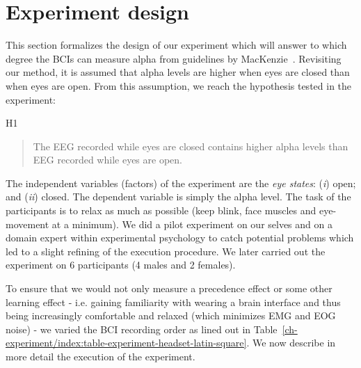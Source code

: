 \documentclass[a4paper,10pt,english,lof,lot,twoside]{puthesis}
\begin{document}
\section{Experiment design}
\label{ch-experiment/index:experiment-design}
This section formalizes the design of our experiment which will
answer to which degree the BCIs can measure alpha from guidelines
by MacKenzie \cite{mackenzie_human-computer_2013}.
Revisiting our
method, it is assumed that alpha levels are higher when eyes are
closed than when eyes are open. From this assumption, we reach
the hypothesis tested in the experiment:

H1
\begin{quote}

The EEG recorded while eyes are closed contains higher alpha levels
than EEG recorded while eyes are open.
\end{quote}

The independent variables (factors) of the experiment are the \emph{eye states}:
(\emph{i}) open; and (\emph{ii}) closed. The dependent variable is simply the alpha
level. The task of the participants is to relax as much as possible (keep
blink, face muscles and eye-movement at a minimum). We did a pilot experiment on
our selves and on a domain expert within experimental psychology to catch
potential problems which led to a slight refining of the execution procedure.
We later carried out the experiment on 6 participants (4 males and 2 females).

To ensure that we would not only measure a precedence effect or some other
learning effect - i.e. gaining familiarity with wearing a brain interface and
thus being increasingly comfortable and relaxed (which minimizes EMG and EOG
noise) - we varied the BCI recording order as lined out in Table \ref{ch-experiment/index:table-experiment-headset-latin-square}. We now describe in more detail
the execution of the experiment.
\end{document}
